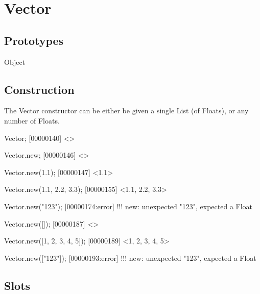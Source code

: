 
\section{Vector}

\subsection{Prototypes}
\begin{refObjects}
\item[Object]
\end{refObjects}

\subsection{Construction}

The Vector constructor can be either be given a single List (of Floats), or
any number of Floats.

\begin{urbiscript}
Vector;
[00000140] <>

Vector.new;
[00000146] <>

Vector.new(1.1);
[00000147] <1.1>

Vector.new(1.1, 2.2, 3.3);
[00000155] <1.1, 2.2, 3.3>

Vector.new("123");
[00000174:error] !!! new: unexpected "123", expected a Float

Vector.new([]);
[00000187] <>

Vector.new([1, 2, 3, 4, 5]);
[00000189] <1, 2, 3, 4, 5>

Vector.new(["123"]);
[00000193:error] !!! new: unexpected "123", expected a Float
\end{urbiscript}

\subsection{Slots}

